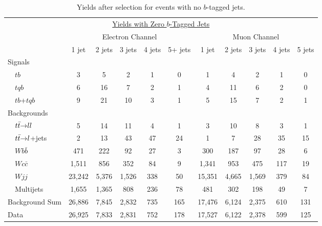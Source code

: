 \vspace{-0.3in}
\begin{table}[!h!tbp]
\begin{center}
\begin{minipage}{6in}
\begin{ruledtabular}
\begin{tabular}{l||ccccc|ccccc}
\multicolumn{11}{c}{\hspace{1in}\underline{Yields with Zero $b$-Tagged Jets}} \vspace{0.1in} \\
& \multicolumn{5}{c|}{Electron Channel} & \multicolumn{5}{c}{Muon Channel} \\
                         & 1 jet & 2 jets & 3 jets & 4 jets & 5+ jets
                         & 1 jet & 2 jets & 3 jets & 4 jets & 5 jets \\
\hline
\hline
Signals                  &        &       &       &       &      &        &       &       &      &       \\
~~$tb$                   &      3 &     5 &     2 &     1 &    0 &     1 &     4 &     2 &     1 &     0 \\
~~$tqb$                  &      6 &    16 &     7 &     2 &    1 &     4 &    11 &     6 &     2 &     0 \\
~~$tb$+$tqb$             &      9 &    21 &    10 &     3 &    1 &     5 &    15 &     7 &     2 &     1 \\
Backgrounds              &         &       &       &       &      &        &       &       &      &      \\
~~${\mbox{$t\bar{t}$}}{\rightarrow}ll$     &      5 &    14 &    11 &     4 &    1 &     3 &    10 &     8 &     3 &     1 \\
~~${\mbox{$t\bar{t}$}}{\rightarrow}l$+jets &      2 &    13 &    43 &    47 &   24 &     1 &     7 &    28 &    35 &    15 \\
~~$Wb\bar{b}$            &    471 &   222 &    92 &    27 &    3 &   300 &   187 &    97 &    28 &     6 \\
~~$Wc\bar{c}$            &  1,511 &   856 &   352 &    84 &    9 & 1,341 &   953 &   475 &   117 &    19 \\
~~$Wjj$                  & 23,242 & 5,376 & 1,526 &   338 &   50 &15,351 & 4,665 & 1,569 &   379 &    84 \\
~~Multijets              &  1,655 & 1,365 &   808 &   236 &   78 &   481 &   302 &   198 &    49 &     7 \\
\hline
Background Sum           & 26,886 & 7,845 & 2,832 &   735 &  165 &17,476 & 6,124 & 2,375 &   610 &   131 \\
\hline
Data                     & 26,925 & 7,833 & 2,831 &   752 &  178 &17,527 & 6,122 & 2,378 &   599 &   125
\end{tabular}
\end{ruledtabular}
\vspace{-0.1in}
\caption[zerotagyields]{Yields after selection for events with no
$b$-tagged jets.}
\label{zerotag-yields}
\end{minipage}
\end{center}
\end{table}

